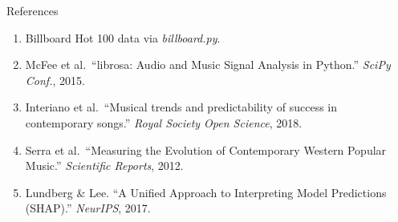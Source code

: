 \documentclass[final]{beamer}
\newlength{\sepwidth}
\newlength{\colwidth}
\newcommand{\separatorcolumn}{\begin{column}{\sepwidth}\end{column}}
\begin{document}
\begin{frame}[t]
\begin{columns}[t]
\begin{column}{\colwidth}
  \begin{block}{References}
    \footnotesize{
    \begin{enumerate}
      \item Billboard Hot 100 data via \textit{billboard.py}.
      \item McFee et al.\ ``librosa: Audio and Music Signal Analysis in Python.'' \textit{SciPy Conf.}, 2015.
      \item \label{interiano2018} Interiano et al.\ ``Musical trends and predictability of success in contemporary songs.'' \textit{Royal Society Open Science}, 2018.
      \item Serra et al.\ ``Measuring the Evolution of Contemporary Western Popular Music.'' \textit{Scientific Reports}, 2012.
      \item Lundberg \& Lee. ``A Unified Approach to Interpreting Model Predictions (SHAP).'' \textit{NeurIPS}, 2017.
    \end{enumerate}
    }
  \end{block}

\end{column}

\separatorcolumn
\end{columns}
\end{frame}
\end{document}
